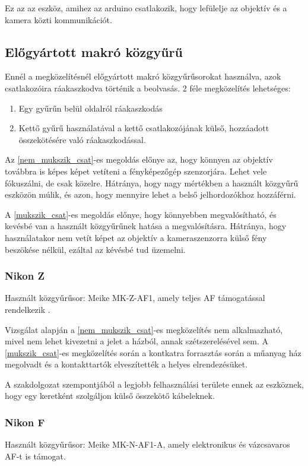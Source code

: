 \label{sec:mero_berendezes}
Ez az az eszköz, amihez az arduino csatlakozik, hogy lefülelje az objektív és a kamera közti kommunikációt.
\subsection{Előgyártott makró közgyűrű}
Ennél a megközelítésnél előgyártott makró közgyűrűsorokat használva, azok csatlakozóira ráakaszkodva történik a beolvasás.
2 féle megközelítés lehetséges:
\begin{enumerate}
    \item Egy gyűrűn belül oldalról ráakaszkodás \label{nem_mukszik_csat}
    \item Kettő gyűrű használatával a kettő csatlakozójának külső, hozzáadott összekötésére való ráakaszkodással.\label{mukszik_csat}
\end{enumerate}

Az \ref{nem_mukszik_csat}-es megoldás előnye az, hogy könnyen az objektív továbbra is képes képet vetíteni a fényképezőgép szenzorjára. Lehet vele fókuszálni, de csak közelre.
Hátránya, hogy nagy mértékben a használt közgyűrű eszközön múlik, és azon, hogy mennyire lehet a belső jelhordozókhoz hozzáférni.

A \ref{mukszik_csat}-es megoldás előnye, hogy könnyebben megvalósítható, és kevésbé van a használt közgyűrűnek hatása a megvalósításra.
Hátránya, hogy használatakor nem vetít képet az objektív a kameraszenzorra külső fény beszökése nélkül, ezáltal az kévésbé tud üzemelni.  
\subsubsection{Nikon Z}
Használt közgyűrűsor: Meike MK-Z-AF1, amely teljes AF támogatással rendelkezik \cite{meike_z}.

Vizsgálat alapján a \ref{nem_mukszik_csat}-es megközelítés nem alkalmazható, mivel nem lehet kivezetni a jelet a házból, annak szétszerelésével sem.
A \ref{mukszik_csat}-es megközelítés során a kontkatra forrasztás során a műanyag ház megolvadt és a kontakttartók elveszítették a helyes elrendezésüket.

A szakdolgozat szempontjából a legjobb felhasználási területe ennek az eszköznek, hogy egy keretként szolgáljon külső összekötő kábeleknek.
\subsubsection{Nikon F}
Használt közgyűrűsor: Meike MK-N-AF1-A, amely elektronikus és vázcsavaros AF-t is támogat.\cite{meike_f}

